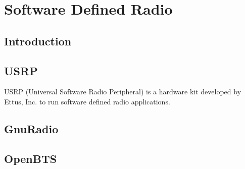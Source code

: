 \chapter{Software Defined Radio}
\section{Introduction}
\section{USRP}
USRP (Universal Software Radio Peripheral) is a hardware kit developed by Ettus, Inc. to run software defined radio applications.

\section{GnuRadio}
\section{OpenBTS}
